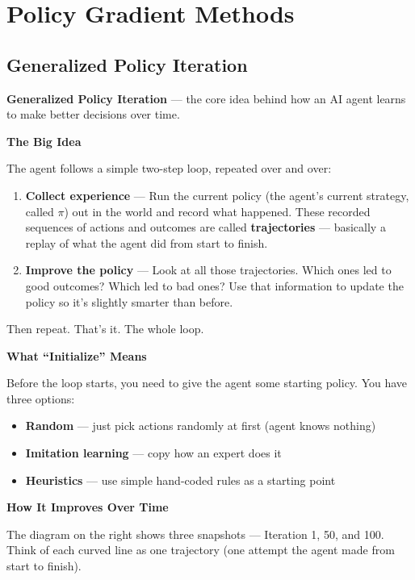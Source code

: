 \section{Policy Gradient Methods}

\subsection{Generalized Policy Iteration}

\textbf{Generalized Policy Iteration} --- the core idea behind how an AI agent learns to make better decisions over time.

\textbf{The Big Idea}

The agent follows a simple two-step loop, repeated over and over:

\begin{enumerate}
    \item \textbf{Collect experience} --- Run the current policy (the agent's current strategy, called $\pi$) out in the world and record what happened. These recorded sequences of actions and outcomes are called \textbf{trajectories} --- basically a replay of what the agent did from start to finish.
    \item \textbf{Improve the policy} --- Look at all those trajectories. Which ones led to good outcomes? Which led to bad ones? Use that information to update the policy so it's slightly smarter than before.
\end{enumerate}

Then repeat. That's it. The whole loop.

\textbf{What ``Initialize'' Means}

Before the loop starts, you need to give the agent some starting policy. You have three options:

\begin{itemize}
    \item \textbf{Random} --- just pick actions randomly at first (agent knows nothing)
    \item \textbf{Imitation learning} --- copy how an expert does it
    \item \textbf{Heuristics} --- use simple hand-coded rules as a starting point
\end{itemize}

\textbf{How It Improves Over Time}

The diagram on the right shows three snapshots --- Iteration 1, 50, and 100. Think of each curved line as one trajectory (one attempt the agent made from start to finish).


